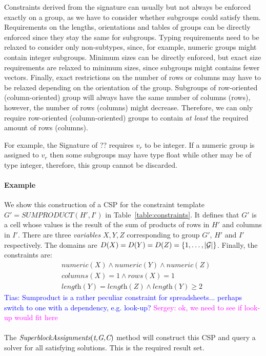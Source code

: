 \documentclass{IEEEtran}
\newcommand{\sergey}[1]{\textcolor{magenta}{{\sc Sergey:} #1}\xspace}
\newcommand{\tias}[1]{\textcolor{blue}{{\sc Tias:} #1}\xspace}
\newcommand{\format}[1]{\textit{#1}\xspace}
\newcommand{\generategroups}{\format{SuperblockAssignments}}
\newcommand{\CSignature}{Signature\xspace}
\newcommand{\eccalc}[2]{\ensuremath{#1 = #2}}
\newcommand{\ecsumprod}[3]{\eccalc{#1}{\textit{SUMPRODUCT}(#2, #3)}}
\newcommand{\plength}{\format{length}}
\newcommand{\prows}{\format{rows}}
\newcommand{\pcols}{\format{columns}}
\theoremstyle{definition}
\begin{document}
Constraints derived from the signature can usually but not always be enforced exactly on a group, as we have to consider whether subgroups could satisfy them.
Requirements on the lengths, orientations and tables of groups can be directly enforced since they stay the same for subgroups.
Typing requirements need to be relaxed to consider only non-subtypes, since, for example, numeric groups might contain integer subgroups.
Minimum sizes can be directly enforced, but exact size requirements are relaxed to minimum sizes, since subgroups might contains fewer vectors.
Finally, exact restrictions on the number of rows or columns may have to be relaxed depending on the orientation of the group.
Subgroups of row-oriented (column-oriented) group will always have the same number of columns (rows), however, the number of rows (columns) might decrease.
Therefore, we can only require row-oriented (column-oriented) groups to contain \textit{at least} the required amount of rows (columns).

For example, the \CSignature of ?? requires $v_r$ to be integer.
If a numeric group is assigned to $v_r$ then some subgroups may have type float while other may be of type integer, therefore, this group cannot be discarded.


\paragraph{Example}
We show this construction of a CSP for the constraint template $\ecsumprod{G'}{H'}{I'}$ in Table~\ref{table:constraints}. It defines that $G'$ is a cell whose values is the result of the sum of products of rows in $H'$ and columns in $I'$.
%
There are three \textit{variables} $X, Y, Z$ corresponding to group $G'$, $H'$ and $I'$ respectively. The domains are $D(X) = D(Y) = D(Z) = \{1, \ldots, |{\cal G}|\}$. Finally, the constraints are:
\begin{align*}
&numeric(X) \land numeric(Y) \land numeric(Z) \\
&\pcols(X) = 1 \land \prows(X) = 1 \\
&\plength(Y) = \plength(Z) \land \plength(Y) \geq 2
\end{align*}
\tias{Sumproduct is a rather peculiar constraint for spreadsheets... perhaps switch to one with a dependency, e.g. look-up?}
\sergey{ok, we need to see if look-up would fit here}
\\\\


The $\generategroups(\textit{t,{\cal G},C})$ method will construct this CSP and query a solver for all satisfying solutions. This is the required result set.
\end{document}

